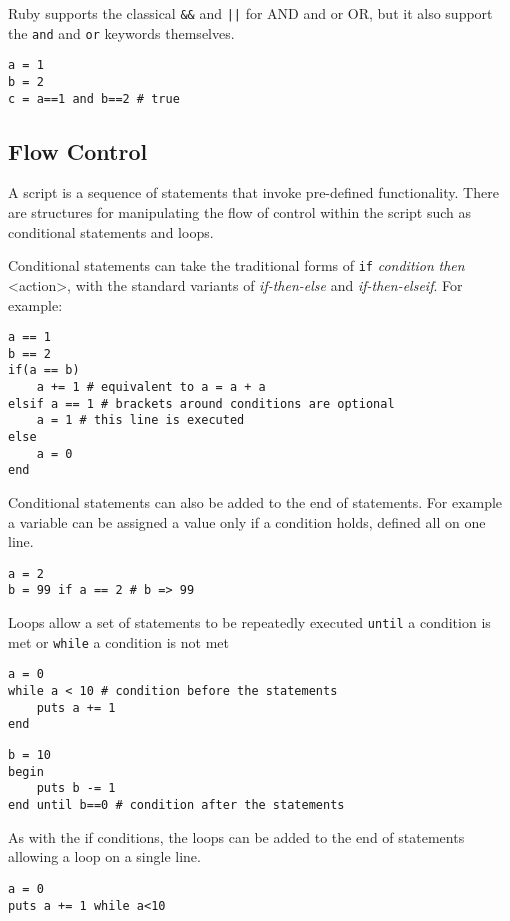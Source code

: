 Ruby supports the classical \texttt{\&\&} and \texttt{||} for AND and or OR, but it also support the \texttt{and} and \texttt{or} keywords themselves.

\begin{lstlisting}
a = 1
b = 2
c = a==1 and b==2 # true
\end{lstlisting}

\subsection{Flow Control}
A script is a sequence of statements that invoke pre-defined functionality. There are structures for manipulating the flow of control within the script such as conditional statements and loops.

Conditional statements can take the traditional forms of \texttt{if} \emph{condition} \emph{then} <action>, with the standard variants of \emph{if-then-else} and \emph{if-then-elseif}. For example:

\begin{lstlisting}
a == 1
b == 2
if(a == b) 
	a += 1 # equivalent to a = a + a
elsif a == 1 # brackets around conditions are optional
	a = 1 # this line is executed
else 
 	a = 0
end
\end{lstlisting}

Conditional statements can also be added to the end of statements. For example a variable can be assigned a value only if a condition holds, defined all on one line.

\begin{lstlisting}
a = 2
b = 99 if a == 2 # b => 99
\end{lstlisting}

Loops allow a set of statements to be repeatedly executed \texttt{until} a condition is met or \texttt{while} a condition is not met

\begin{lstlisting}
a = 0
while a < 10 # condition before the statements
	puts a += 1
end
\end{lstlisting}

\begin{lstlisting}
b = 10
begin 
	puts b -= 1
end until b==0 # condition after the statements
\end{lstlisting}

As with the if conditions, the loops can be added to the end of statements allowing a loop on a single line.

\begin{lstlisting}
a = 0
puts a += 1 while a<10
\end{lstlisting}

